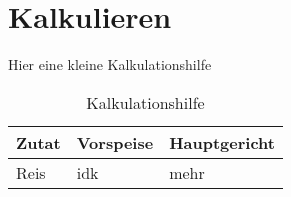 \section{Kalkulieren}\label{sec:kalkulieren}

Hier eine kleine Kalkulationshilfe


\begin{table}[H]
    \centering
    \caption{Kalkulationshilfe}
    \label{tab:kalkulationshilfe}
    \begin{tabular}{lll}
        \hline
        Zutat&Vorspeise&Hauptgericht\\\hline
        Reis&idk&mehr\\\hline
    \end{tabular}
\end{table}
